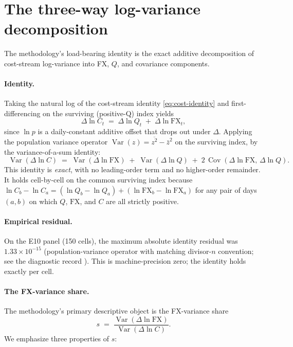 \documentclass[11pt,letterpaper]{article}
\newcommand{\Var}{\operatorname{Var}}
\newcommand{\Cov}{\operatorname{Cov}}
\newcommand{\dln}{\Delta\ln}
\newcommand{\Cfx}{\mathrm{FX}}
\theoremstyle{assumption}
\begin{document}
\section{The three-way log-variance decomposition}
\label{sec:e10-decomposition}

The methodology's load-bearing identity is the exact additive decomposition
of cost-stream log-variance into FX, $Q$, and covariance components.

\paragraph{Identity.}
Taking the natural log of the cost-stream identity \eqref{eq:cost-identity}
and first-differencing on the surviving (positive-Q) index yields
\begin{equation}
  \dln C_t \;=\; \dln Q_t \;+\; \dln \Cfx_t,
  \label{eq:dlog-identity}
\end{equation}
since $\ln p$ is a daily-constant additive offset that drops out under
$\Delta$. Applying the population variance operator $\Var(z) = \overline{z^2} -
\bar z^2$ on the surviving index, by the variance-of-a-sum identity:
\begin{equation}
  \boxed{\;\;\Var\!\left(\dln C\right)
  \;=\;
  \Var\!\left(\dln \Cfx\right) \;+\; \Var\!\left(\dln Q\right)
  \;+\; 2\,\Cov\!\left(\dln \Cfx,\, \dln Q\right).\;\;}
  \label{eq:three-way}
\end{equation}
This identity is \emph{exact}, with no leading-order term and no higher-order
remainder. It holds cell-by-cell on the common surviving index because
\(\ln C_b - \ln C_a = (\ln Q_b - \ln Q_a) + (\ln \Cfx_b - \ln \Cfx_a)\) for
any pair of days $(a,b)$ on which $Q$, $\Cfx$, and $C$ are all strictly positive.

\paragraph{Empirical residual.}
On the E10 panel (150 cells), the maximum absolute identity residual was
$1.33\times 10^{-15}$ (population-variance operator with matching
divisor-$n$ convention; see the diagnostic record
).
This is machine-precision zero; the identity holds exactly per cell.

\paragraph{The FX-variance share.}
The methodology's primary descriptive object is the FX-variance share
\begin{equation}
  s \;=\; \frac{\Var(\dln \Cfx)}{\Var(\dln C)}.
  \label{eq:fx-share}
\end{equation}
We emphasize three properties of $s$:
\end{document}
